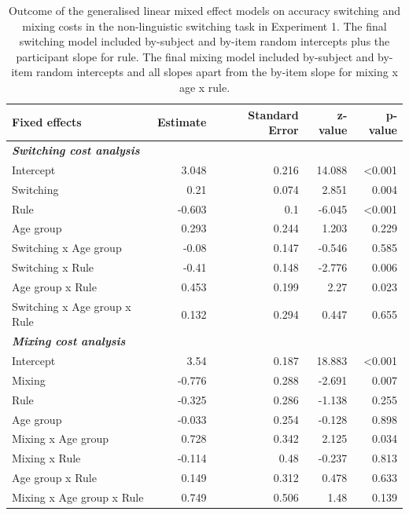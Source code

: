 \documentclass[
]{article}
\begin{document}
\begin{table}[H]

\caption{\label{tab:TableS4}Outcome of the generalised linear mixed effect models on accuracy switching and mixing costs in the non-linguistic switching task in Experiment 1. The final switching model included by-subject and by-item random intercepts plus the participant slope for rule. The final mixing model included by-subject and by-item random intercepts and all slopes apart from the by-item slope for mixing x age x rule.}
\centering
\begin{tabular}[t]{lrrrr}
\toprule
\textbf{Fixed effects} & \textbf{Estimate} & \textbf{Standard Error} & \textbf{z-value} & \textbf{p-value}\\
\midrule
\em{\textbf{Switching cost analysis}} & \em{\textbf{}} & \em{\textbf{}} & \em{\textbf{}} & \em{\textbf{}}\\
Intercept & 3.048 & 0.216 & 14.088 & <0.001\\
Switching & 0.21 & 0.074 & 2.851 & 0.004\\
Rule & -0.603 & 0.1 & -6.045 & <0.001\\
Age group & 0.293 & 0.244 & 1.203 & 0.229\\
\addlinespace
Switching x Age group & -0.08 & 0.147 & -0.546 & 0.585\\
Switching x Rule & -0.41 & 0.148 & -2.776 & 0.006\\
Age group x Rule & 0.453 & 0.199 & 2.27 & 0.023\\
Switching x Age group x Rule & 0.132 & 0.294 & 0.447 & 0.655\\
\em{\textbf{Mixing cost analysis}} & \em{\textbf{}} & \em{\textbf{}} & \em{\textbf{}} & \em{\textbf{}}\\
\addlinespace
Intercept & 3.54 & 0.187 & 18.883 & <0.001\\
Mixing & -0.776 & 0.288 & -2.691 & 0.007\\
Rule & -0.325 & 0.286 & -1.138 & 0.255\\
Age group & -0.033 & 0.254 & -0.128 & 0.898\\
Mixing x Age group & 0.728 & 0.342 & 2.125 & 0.034\\
\addlinespace
Mixing x Rule & -0.114 & 0.48 & -0.237 & 0.813\\
Age group x Rule & 0.149 & 0.312 & 0.478 & 0.633\\
Mixing x Age group x Rule & 0.749 & 0.506 & 1.48 & 0.139\\
\bottomrule
\end{tabular}
\end{table}
\end{document}
